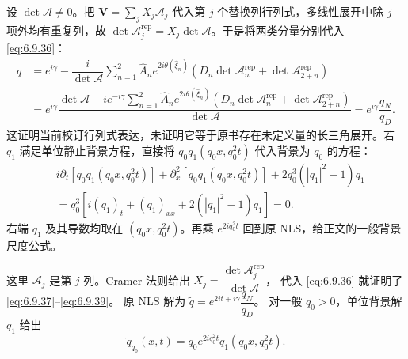 \documentclass[lang=cn,scheme=chinese,mode=simple,device=normal,color=blue,
math=cm,thmcnt=section,12pt]{elegantbook}
\begin{document}
\begin{callout}
    设 $\det\mathcal A\ne0$。把 $\displaystyle \boldsymbol V=\sum\limits_jX_j\mathcal A_j$ 代入第 $j$ 个替换列行列式，多线性展开中除 $j$ 项外均有重复列，故 $\det\mathcal A_j^{\mathrm{rep}}=X_j\det\mathcal A$。于是将两类分量分别代入 \eqref{eq:6.9.36}：
    \[
        \begin{aligned}
            q & =e^{i\gamma}-\dfrac{i}{\det\mathcal A}\sum\limits_{n=1}^2
            \widehat A_ne^{2i\theta(\widehat\xi_n)}
            \left(D_n\det\mathcal A_n^{\mathrm{rep}}+\det\mathcal A_{2+n}^{\mathrm{rep}}\right) \\
              & =e^{i\gamma}\dfrac{\det\mathcal A-ie^{-i\gamma}\displaystyle\sum\limits_{n=1}^2
                \widehat A_ne^{2i\theta(\widehat\xi_n)}
                \left(D_n\det\mathcal A_n^{\mathrm{rep}}+\det\mathcal A_{2+n}^{\mathrm{rep}}\right)}{\det\mathcal A}
            =e^{i\gamma}\dfrac{q_N}{q_D}.
        \end{aligned}
    \]
    这证明当前校订行列式表达，未证明它等于原书存在未定义量的长三角展开。若 $q_1$ 满足单位静止背景方程，直接将 $q_0q_1(q_0x,q_0^2t)$ 代入背景为 $q_0$ 的方程：
    \[
        \begin{aligned}
             & i\partial_t[q_0q_1(q_0x,q_0^2t)]+\partial_x^2[q_0q_1(q_0x,q_0^2t)]
            +2q_0^3(|q_1|^2-1)q_1                                                 \\
             & =q_0^3[i(q_1)_t+(q_1)_{xx}+2(|q_1|^2-1)q_1]=0.
        \end{aligned}
    \]
    右端 $q_1$ 及其导数均取在 $(q_0x,q_0^2t)$。再乘 $e^{2iq_0^2t}$ 回到原 NLS，给正文的一般背景尺度公式。
\end{callout}

这里 $\mathcal A_j$ 是第 $j$ 列。Cramer 法则给出
$X_j=\dfrac{\det\mathcal A_j^{\mathrm{rep}}}{\det\mathcal A}$，
代入 \eqref{eq:6.9.36} 就证明了 \eqref{eq:6.9.37}--\eqref{eq:6.9.39}。
原 NLS 解为 $\widetilde q=e^{2it+i\gamma}\dfrac{q_N}{q_D}$。
对一般 $q_0>0$，单位背景解 $q_1$ 给出
\[
    \widetilde q_{q_0}(x,t)=q_0e^{2iq_0^2t}q_1(q_0x,q_0^2t).
\]
\end{document}
